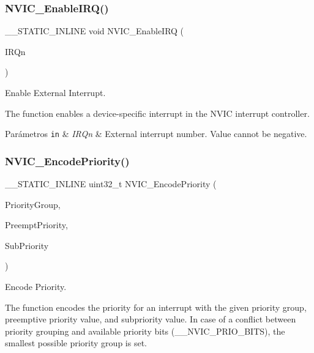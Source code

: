 \subsubsection{\texorpdfstring{N\+V\+I\+C\+\_\+\+Enable\+I\+R\+Q()}{NVIC\_EnableIRQ()}}
{\footnotesize\ttfamily \+\_\+\+\_\+\+S\+T\+A\+T\+I\+C\+\_\+\+I\+N\+L\+I\+NE void N\+V\+I\+C\+\_\+\+Enable\+I\+RQ (\begin{DoxyParamCaption}\item[{I\+R\+Qn\+\_\+\+Type}]{I\+R\+Qn }\end{DoxyParamCaption})}



Enable External Interrupt. 

The function enables a device-\/specific interrupt in the N\+V\+IC interrupt controller.


\begin{DoxyParams}[1]{Parámetros}
\mbox{\tt in}  & {\em I\+R\+Qn} & External interrupt number. Value cannot be negative. \\
\hline
\end{DoxyParams}
\mbox{\label{group___c_m_s_i_s___core___n_v_i_c_functions_gadb94ac5d892b376e4f3555ae0418ebac}} 
\subsubsection{\texorpdfstring{N\+V\+I\+C\+\_\+\+Encode\+Priority()}{NVIC\_EncodePriority()}}
{\footnotesize\ttfamily \+\_\+\+\_\+\+S\+T\+A\+T\+I\+C\+\_\+\+I\+N\+L\+I\+NE uint32\+\_\+t N\+V\+I\+C\+\_\+\+Encode\+Priority (\begin{DoxyParamCaption}\item[{uint32\+\_\+t}]{Priority\+Group,  }\item[{uint32\+\_\+t}]{Preempt\+Priority,  }\item[{uint32\+\_\+t}]{Sub\+Priority }\end{DoxyParamCaption})}



Encode Priority. 

The function encodes the priority for an interrupt with the given priority group, preemptive priority value, and subpriority value. In case of a conflict between priority grouping and available priority bits (\+\_\+\+\_\+\+N\+V\+I\+C\+\_\+\+P\+R\+I\+O\+\_\+\+B\+I\+TS), the smallest possible priority group is set.


